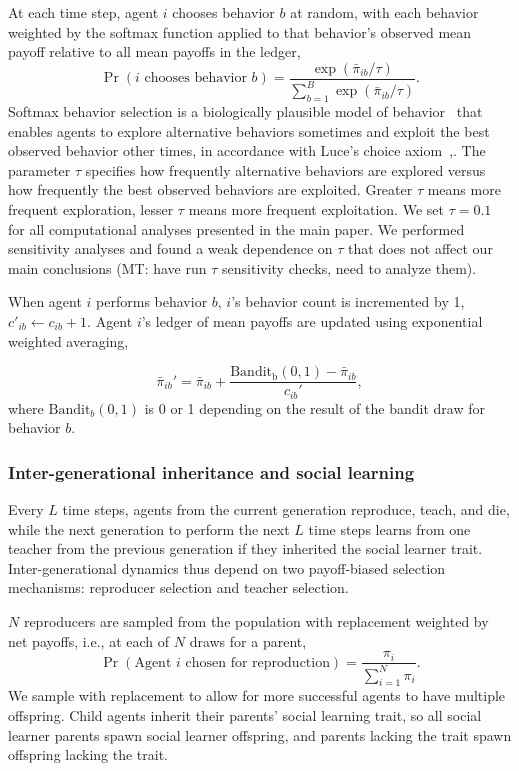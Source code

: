 \documentclass[letterpaper,11.5pt]{scrartcl}
\newcommand{\mt}[1]{{\textcolor{myorange} {({\tiny MT:} #1)}}}
\begin{document}
At each time step, 
agent $i$ chooses behavior $b$ at random, with each behavior
weighted by the softmax function applied to that behavior's observed mean payoff
relative to all mean payoffs in the ledger,
\begin{equation}
  \Pr(i \text{ chooses behavior } b) = \frac{\exp(\bar\pi_{ib}
  / \tau) }{ \sum_{b=1}^B \exp(\bar\pi_{ib} / \tau)}.
\end{equation}  
Softmax behavior selection is a
biologically plausible model of behavior~\cite{Schulz2019} 
that enables agents to explore
alternative behaviors sometimes and exploit the best observed behavior other times,
in accordance with Luce's choice axiom~\cite{Luce1959},.
The parameter $\tau$ specifies how frequently alternative behaviors are
explored versus how frequently the best observed behaviors are 
exploited. Greater $\tau$ means more frequent exploration, lesser $\tau$ means
more frequent exploitation. We set $\tau = 0.1$ for
all computational analyses presented in the main paper. We 
 performed
sensitivity analyses and found a weak dependence on $\tau$ that does not affect our
main conclusions \mt{have run $\tau$ sensitivity checks, need to analyze them}.

When agent $i$ performs behavior $b$, $i$'s behavior count 
is incremented by 1, $c'_{ib} \leftarrow c_{ib} + 1$. Agent $i$'s ledger of mean 
payoffs are updated %
using exponential weighted averaging, 

\begin{equation}
  \bar\pi_{ib}' = \bar\pi_{ib} +
    \frac{\mathrm{Bandit_{b}(0, 1)} - \bar\pi_{ib}}{c_{ib}'},
\end{equation}
where 
$\mathrm{Bandit}_{b}(0, 1)$
is 0 or 1 depending on the result of the bandit draw for behavior $b$. 


\subsubsection{Inter-generational inheritance and social learning}

Every $L$ time steps, agents from the current generation reproduce, teach,
and die, while the next generation to perform the next $L$ time steps learns
from one teacher from the previous generation if they inherited the social 
learner trait. Inter-generational dynamics thus depend on 
two payoff-biased selection mechanisms: reproducer selection
and teacher selection. 

$N$ reproducers are sampled from the population with
replacement weighted by net payoffs, i.e., at each of $N$ draws for a parent,
\begin{equation}
  \Pr(\text{Agent $i$ chosen for reproduction}) = \frac{\pi_i}{\sum_{i=1}^N \pi_i}.
\end{equation}
\noindent
We sample with replacement to allow for more successful agents to have multiple
offspring. Child agents inherit their parents' social learning trait, so 
all social learner parents spawn social learner offspring, and parents lacking
the trait spawn offspring lacking the trait. 
\end{document}
